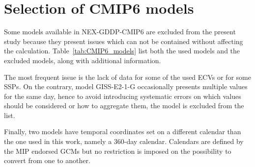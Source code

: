 \section{Selection of CMIP6 models}
\label{sec:Selection of CMIP6 models}
Some models available in NEX-GDDP-CMIP6 are excluded from the present study because they present issues which can not be contained without affecting the calculation. Table~\ref{tab:CMIP6_models} list both the used models and the excluded models, along with additional information.

The most frequent issue is the lack of data for some of the used \glspl{ECV} or for some \glspl{SSP}. On the contrary, model GISS-E2-1-G occasionally presents multiple values for the same day, hence to avoid introducing systematic errors on which values should be considered or how to aggregate them, the model is excluded from the list.

Finally, two models have temporal coordinates set on a different calendar than the one used in this work, namely a 360-day calendar. Calendars are defined by the \gls{MIP} endorsed \glspl{GCM} but no restriction is imposed on the possibility to convert from one to another.

